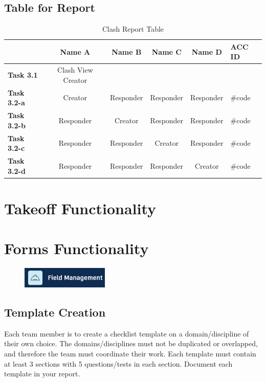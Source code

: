 \subsection{Table for Report}

\begin{table}[ht]
	\centering
	\begin{tabular}{|l|c|c|c|c|l|}
		\hline
		& \textbf{Name A} & \textbf{Name B} & \textbf{Name C} & \textbf{Name D} & \textbf{ACC ID}\\
		\hline
		\textbf{Task 3.1} & Clash View Creator &  &  &  & \\
		\hline
		\textbf{Task 3.2-a} & Creator & Responder & Responder & Responder & \#code\\
		\textbf{Task 3.2-b} & Responder & Creator & Responder & Responder & \#code\\
		\textbf{Task 3.2-c} & Responder & Responder & Creator & Responder & \#code\\
		\textbf{Task 3.2-d} & Responder & Responder & Responder & Creator & \#code\\
		\hline
	\end{tabular}
	\caption{Clash Report Table }
	\label{tab:clash-items}
\end{table}


\newpage
\section{Takeoff Functionality}







\newpage
\section{Forms Functionality}

\begin{figure}[h!t]
	\includegraphics[height=1.0cm]{RevitAssets/fieldmgmt}
	\label{fig:dieldmgmt}
\end{figure}



\subsection{Template Creation}

Each team member is to create a checklist template on a domain/discipline of their own choice.  The domains/disciplines must not be duplicated or overlapped, and therefore the team must coordinate their work.  Each template must contain at least 3 sections with 5 questions/tests in each section.  Document each template in your report.

